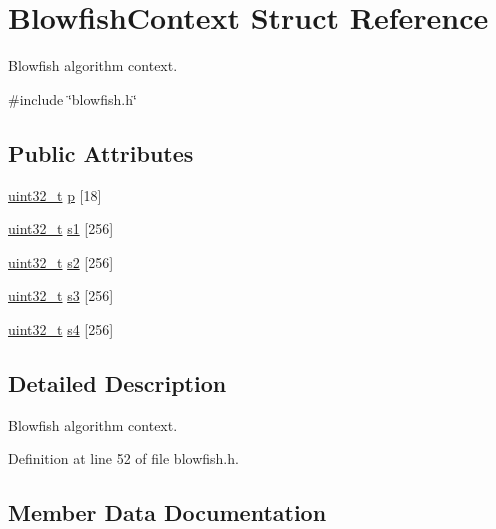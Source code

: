 \hypertarget{structBlowfishContext}{}\section{Blowfish\+Context Struct Reference}
\label{structBlowfishContext}


Blowfish algorithm context.  




{\ttfamily \#include \char`\"{}blowfish.\+h\char`\"{}}

\subsection*{Public Attributes}
\begin{DoxyCompactItemize}
\item 
\hyperlink{stdint_8h_a435d1572bf3f880d55459d9805097f62}{uint32\+\_\+t} \hyperlink{structBlowfishContext_aa0723217b39dd858e6944f98f5b2e048}{p} \mbox{[}18\mbox{]}
\item 
\hyperlink{stdint_8h_a435d1572bf3f880d55459d9805097f62}{uint32\+\_\+t} \hyperlink{structBlowfishContext_a5ea9975a381f6f68d9f779fb4bd4435e}{s1} \mbox{[}256\mbox{]}
\item 
\hyperlink{stdint_8h_a435d1572bf3f880d55459d9805097f62}{uint32\+\_\+t} \hyperlink{structBlowfishContext_a02c1fa70573583c95087509ec5d80a51}{s2} \mbox{[}256\mbox{]}
\item 
\hyperlink{stdint_8h_a435d1572bf3f880d55459d9805097f62}{uint32\+\_\+t} \hyperlink{structBlowfishContext_a3a258e0ef25ed4d5690c846da3ffd5dd}{s3} \mbox{[}256\mbox{]}
\item 
\hyperlink{stdint_8h_a435d1572bf3f880d55459d9805097f62}{uint32\+\_\+t} \hyperlink{structBlowfishContext_a752acc62c38eea0d09e491d2bd23d67e}{s4} \mbox{[}256\mbox{]}
\end{DoxyCompactItemize}


\subsection{Detailed Description}
Blowfish algorithm context. 

Definition at line 52 of file blowfish.\+h.



\subsection{Member Data Documentation}
\mbox{\label{structBlowfishContext_aa0723217b39dd858e6944f98f5b2e048}} 
